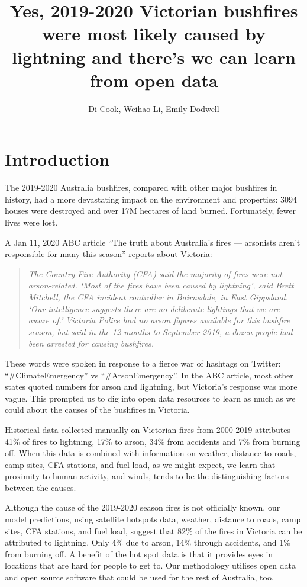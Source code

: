 \documentclass[
  11pt,
  a4paper,
]{article}
\title{Yes, 2019-2020 Victorian bushfires were most likely caused by lightning and there's we can learn from open data}
\author{Di Cook, Weihao Li, Emily Dodwell}
\date{}
\begin{document}
\maketitle

\hypertarget{intro}{%
\section{Introduction}\label{intro}}

The 2019-2020 Australia bushfires, compared with other major bushfires in history, had a more devastating impact on the environment and properties: 3094 houses were destroyed and over 17M hectares of land burned. Fortunately, fewer lives were lost.

A Jan 11, 2020 ABC article ``The truth about Australia's fires --- arsonists aren't responsible for many this season'' reports about Victoria:

\begin{quote}
\emph{The Country Fire Authority (CFA) said the majority of fires were not arson-related. `Most of the fires have been caused by lightning', said Brett Mitchell, the CFA incident controller in Bairnsdale, in East Gippsland. `Our intelligence suggests there are no deliberate lightings that we are aware of.' Victoria Police had no arson figures available for this bushfire season, but said in the 12 months to September 2019, a dozen people had been arrested for causing bushfires.}
\end{quote}

These words were spoken in response to a fierce war of hashtags on Twitter: ``\#ClimateEmergency'' vs ``\#ArsonEmergency''. In the ABC article, most other states quoted numbers for arson and lightning, but Victoria's response was more vague. This prompted us to dig into open data resources to learn as much as we could about the causes of the bushfires in Victoria.

Historical data collected manually on Victorian fires from 2000-2019 attributes 41\% of fires to lightning, 17\% to arson, 34\% from accidents and 7\% from burning off. When this data is combined with information on weather, distance to roads, camp sites, CFA stations, and fuel load, as we might expect, we learn that proximity to human activity, and winds, tends to be the distinguishing factors between the causes.

Although the cause of the 2019-2020 season fires is not officially known, our model predictions, using satellite hotspots data, weather, distance to roads, camp sites, CFA stations, and fuel load, suggest that 82\% of the fires in Victoria can be attributed to lightning. Only 4\% due to arson, 14\% through accidents, and 1\% from burning off. A benefit of the hot spot data is that it provides eyes in locations that are hard for people to get to. Our methodology utilises open data and open source software that could be used for the rest of Australia, too.
\end{document}
